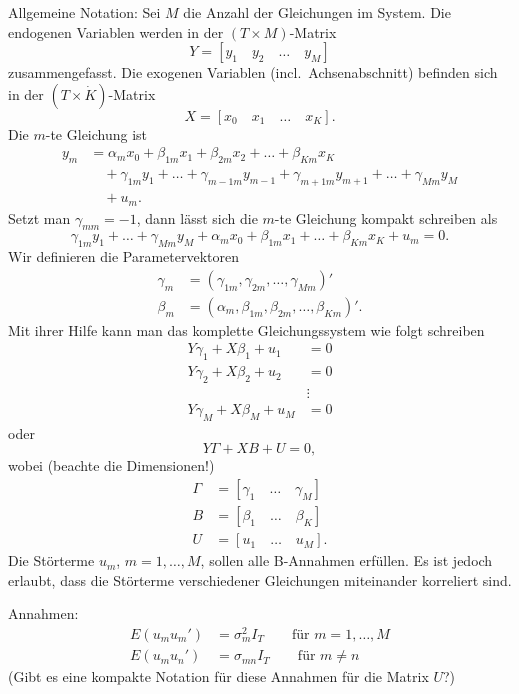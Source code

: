 \documentclass{article}
\begin{document}
Allgemeine Notation: Sei $M$ die Anzahl der Gleichungen im System.
Die endogenen Variablen werden in der $(T\times M)$-Matrix
\[ Y=[y_1\quad y_2\quad \ldots \quad y_M] \]
zusammengefasst. Die exogenen Variablen (incl.\ Achsenabschnitt)
befinden sich in der $(T\times \dot{K})$-Matrix
\[ X=[x_0\quad x_1\quad \ldots \quad x_K]. \]
Die $m$-te Gleichung ist
\begin{align*}
y_m &=\alpha_m x_0+\beta _{1m}x_1+\beta_{2m}x_2+\ldots +\beta _{Km}x_K \\
&\quad+\gamma _{1m}y_{1}+\ldots +\gamma _{m-1m}y_{m-1}+\gamma_{m+1m}y_{m+1}+\ldots +\gamma _{Mm}y_{M} \\
&\quad+u_{m}.
\end{align*}
Setzt man $\gamma _{mm}=-1$, dann lässt sich die $m$-te Gleichung 
kompakt schreiben als
\[ \gamma _{1m}y_{1}+\ldots +\gamma _{Mm}y_{M}
+\alpha _{m}x_{0}+\beta _{1m}x_{1}+\ldots +\beta _{Km}x_{K}+u_{m}=0. \]
Wir definieren die Parametervektoren
\begin{align*}
\gamma_{m} &=(\gamma _{1m},\gamma _{2m},\ldots ,\gamma_{Mm})' \\
\beta_{m} &=(\alpha _{m},\beta _{1m},\beta _{2m},\ldots ,\beta_{Km})'.
\end{align*}
Mit ihrer Hilfe kann man das komplette Gleichungssystem wie folgt schreiben
\begin{align*}
Y\gamma_{1}+X\beta_{1}+u_{1} &= 0 \\
Y\gamma_{2}+X\beta_{2}+u_{2} &= 0 \\
&\vdots \\
Y\gamma_{M}+X\beta_{M}+u_{M} &= 0
\end{align*}
oder 
\[ Y\Gamma+XB+U=0, \]
wobei (beachte die Dimensionen!)
\begin{align*}
\Gamma &=[\gamma_{1}\quad \dots \quad \gamma_{M}] \\
B &=[\beta_{1}\quad \dots \quad \beta_{K}] \\
U &=[u_{1}\quad \dots \quad u_{M}].
\end{align*}
Die Störterme $u_{m}$, $m=1,\ldots ,M$, sollen alle B-Annahmen
erfüllen. Es ist jedoch erlaubt, dass die Störterme verschiedener
Gleichungen miteinander korreliert sind.

Annahmen:
\begin{align*}
E(u_{m}u_{m}') &=\sigma_{m}^{2}I_{T}\qquad \text{für }m=1,\ldots ,M \\
E(u_{m}u_{n}') &=\sigma_{mn}I_{T}\qquad \text{für }m\neq n
\end{align*}
(Gibt es eine kompakte Notation für diese Annahmen für die
Matrix $U$?)
\end{document}
